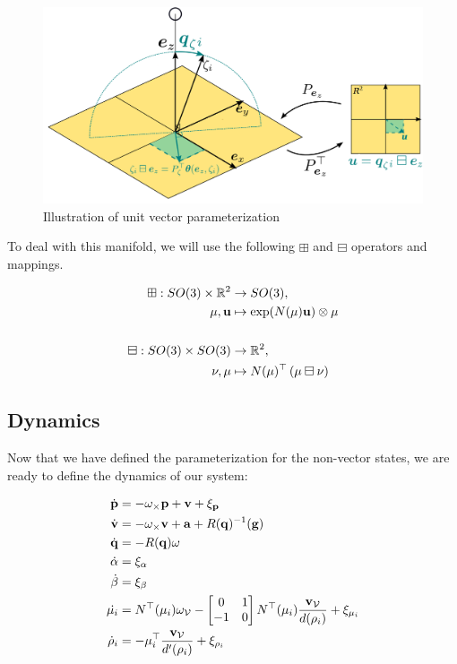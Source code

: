 \documentclass[letterpaper, 10 pt, conference]{ieeeconf}  %
\begin{document}
\begin{figure}
	\includegraphics[width=\columnwidth]{figures/unit_vector_picture.png}
	\caption{Illustration of unit vector parameterization}
	\label{fig:unit_vector}
\end{figure}




To deal with this manifold, we will use the following $\boxplus$ and $\boxminus$ operators and mappings.

\begin{equation}
\begin{aligned}
	\boxplus : SO(3) \times \mathbb{R}^2 &\rightarrow SO(3), \\
	\mathbf{\mu}, \mathbf{u} &\mapsto \exp(N(\mathbf{\mu})\mathbf{u}) \otimes \mathbf{\mu} \\ \\
	\boxminus : SO(3) \times SO(3) &\rightarrow \mathbb{R}^2, \\
	\mathbf{\nu}, \mathbf{\mu} &\mapsto N(\mathbf{\mu})^\top \left( \mathbf{\mu} \boxminus \mathbf{\nu} \right)
	\end{aligned}
\end{equation}





\subsection{Dynamics}

Now that we have defined the parameterization for the non-vector states, we are ready to define the dynamics of our system:

\begin{equation}
\begin{aligned}
	\dot{\mathbf{p}} &= -\mathbf{\omega}_\times \mathbf{p} + \mathbf{v} + \mathbf{\xi}_{\mathbf{p}} \\
	\dot{\mathbf{v}} &= -\mathbf{\omega}_\times \mathbf{v} + \mathbf{a} + R(\mathbf{q})^{-1}(\mathbf{g}) \\
	\dot{\mathbf{q}} &= -R(\mathbf{q})\mathbf{\omega} \\
	\dot{\mathbf{\alpha}} &= \mathbf{\xi}_{\mathbf{\alpha}} \\
	\dot{\mathbf{\beta}} &= \mathbf{\xi}_{\mathbf{\beta}} \\
	\dot{\mathbf{\mu}_i} &= N^\top(\mathbf{\mu}_i)\mathbf{\omega}_{\mathcal{V}} - \begin{bmatrix} 0 & 1 \\ -1 & 0 \end{bmatrix}N^\top(\mu_i)\dfrac{\mathbf{v}_{\mathcal{V}}}{d(\rho_i)} + \mathbf{\xi}_{\mathbf{\mu}_i} \\
	\dot{\rho}_i &= -\mathbf{\mu}_i^\top \dfrac{\mathbf{v}_{\mathcal{V}}}{d'(\rho_i)} + \mathbf{\xi}_{\rho_i}
\end{aligned}
\end{equation}
\end{document}
